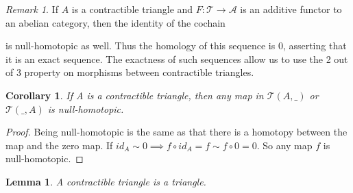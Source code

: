 \documentclass[11pt]{article}
\newtheorem{corollary}{Corollary}[theorem]
\newtheorem{lemma}[theorem]{Lemma}
\theoremstyle{definition}
\theoremstyle{remark}
\newtheorem*{remark}{Remark}
\begin{document}
            \begin{remark}
                If $A$ is a contractible triangle and $F:\mathcal{T}\rightarrow \mathcal{A}$ is an additive functor to an abelian category, then the identity of the cochain 
                \begin{center}
                \end{center}
                is null-homotopic as well. Thus the homology of this sequence is $0$, asserting that it is an exact sequence.
                The exactness of such sequences allow us to use the 2 out of 3 property on morphisms between contractible triangles.
            \end{remark}

            \begin{corollary}
                If A is a contractible triangle, then any map in $\mathcal{T}(A,\_)$ or $\mathcal{T}(\_,A)$ is null-homotopic.
            \end{corollary}

            \begin{proof}
                Being null-homotopic is the same as that there is a homotopy between the map and the zero map. If $id_A\sim 0 \implies f\circ id_A = f \sim f\circ 0 = 0$. So any map $f$ is null-homotopic.
            \end{proof}

            \begin{lemma}
                A contractible triangle is a triangle.
            \end{lemma}
\end{document}
